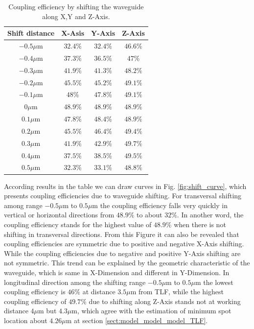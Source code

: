 \begin{table}[!ht]
\caption{Coupling efficiency by shifting the waveguide along X,Y and Z-Axis.}
\centering
\begin{tabular}{c|ccc}
\hline
Shift distance & X-Asis & Y-Axis & Z-Axis \\
\hline
$-0.5\mu$m 		&$32.4\%$	&$32.4\%$&$46.6\%$	\\
$-0.4\mu$m		&$37.3\%$	&$36.5\%$&$47\%$	\\
$-0.3\mu$m 		&$41.9\%$	&$41.3\%$&$48.2\%$	\\
$-0.2\mu$m	  &$45.5\%$	&$45.2\%$&$49.1\%$	\\
$-0.1\mu$m		&$48\%$	&$47.8\%$&$49.1\%$	\\
$0\mu$m			  &$48.9\%$	&$48.9\%$&$48.9\%$	\\
$0.1\mu$m			&$47.8\%$	&$48.4\%$&$48.9\%$	\\
$0.2\mu$m			&$45.5\%$	&$46.4\%$&$49.4\%$	\\
$0.3\mu$m			&$41.9\%$	&$42.9\%$&$49.7\%$	\\
$0.4\mu$m			&$37.5\%$	&$38.5\%$&$49.5\%$	\\
$0.5\mu$m			&$32.3\%$	&$33.1\%$&$48.8\%$	\\
\hline
\end{tabular}
\label{tab:shift_result}
\end{table}
According results in the table we can draw curves in Fig. \ref{fig:shift_curve}, which presents coupling efficiencies due to waveguide shifting. For transversal shifting among range $-0.5\mu$m to $0.5\mu$m the coupling efficiency falls very quickly in vertical or horizontal directions from $48.9\%$ to about $32\%$.  In another word, the coupling efficiency stands for the highest value of $48.9\%$ when there is not shifting in transversal directions. From this Figure it can also be revealed that coupling efficiencies are symmetric due to positive and negative X-Axis shifting. While the coupling efficiencies due to negative and positive Y-Axis shifting are not symmetric. This trend can be explained by the geometric characteristic of the waveguide, which is same in X-Dimension and different in Y-Dimension.  In longitudinal direction among the shifting range $-0.5\mu$m to $0.5\mu$m the lowest coupling efficiency is $46\%$ at distance $3.5\mu$m from TLF, while the highest coupling efficiency of $49.7\%$ due to shifting along Z-Axis stands not at working distance $4\mu$m but $4.3\mu$m, which agree with the estimation of minimum spot location about $4.26\mu$m at section \ref{sect:model_model_model_TLF}. \\

